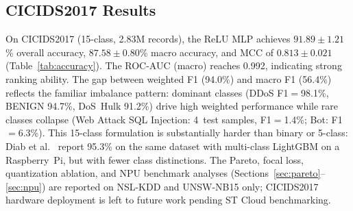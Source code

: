 \documentclass[10pt,twocolumn]{article}
\begin{document}
\begin{table}[t]
\centering
\caption{Per-class metrics (\%, mean$\pm$std, $n{=}20$) for ReLU MLP on UNSW-NB15.
Classes sorted by F1 descending.}
\label{tab:perclass_unsw}
\small
{}
\end{table}

\subsection{CICIDS2017 Results}

On CICIDS2017 (15-class, 2.83M records), the ReLU MLP achieves
$91.89{\pm}1.21$\% overall accuracy, $87.58{\pm}0.80$\% macro
accuracy, and MCC of $0.813{\pm}0.021$ (Table~\ref{tab:accuracy}).
The ROC-AUC (macro) reaches 0.992, indicating strong ranking ability.
The gap between weighted F1 (94.0\%) and macro F1 (56.4\%) reflects
the familiar imbalance pattern: dominant classes (DDoS F1$=$98.1\%,
BENIGN 94.7\%, DoS~Hulk 91.2\%) drive high weighted performance
while rare classes collapse (Web Attack SQL Injection: 4~test
samples, F1$=$1.4\%; Bot: F1$=$6.3\%).
This 15-class formulation is substantially harder than binary or
5-class: Diab et al.~\cite{diab2025rpi} report 95.3\% on the
same dataset with multi-class LightGBM on a Raspberry~Pi, but
with fewer class distinctions.
The Pareto, focal loss, quantization ablation, and NPU benchmark
analyses (Sections~\ref{sec:pareto}--\ref{sec:npu}) are reported
on NSL-KDD and UNSW-NB15 only; CICIDS2017 hardware deployment
is left to future work pending ST Cloud benchmarking.
\end{document}
